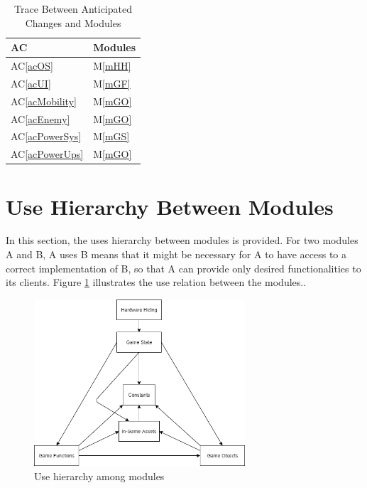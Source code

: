 \documentclass[12pt, titlepage]{article}
\newcommand{\acref}[1]{AC\ref{#1}}
\newcommand{\mref}[1]{M\ref{#1}}
\begin{document}
\begin{table}[H]
\centering
\begin{tabular}{p{} p{}}
\toprule
\textbf{AC} & \textbf{Modules}\\
\midrule
\acref{acOS} & \mref{mHH}\\
\acref{acUI} & \mref{mGF}\\
\acref{acMobility} & \mref{mGO}\\
\acref{acEnemy} & \mref{mGO}\\
\acref{acPowerSys} & \mref{mGS}\\
\acref{acPowerUps} & \mref{mGO}\\
\bottomrule
\end{tabular}
\caption{Trace Between Anticipated Changes and Modules}
\label{TblACT}
\end{table}

\section{Use Hierarchy Between Modules} \label{SecUse}

In this section, the uses hierarchy between modules is provided. For two modules A and B, A uses B means that it might be necessary for A to have access to a correct implementation of B, so that A can provide only desired functionalities to its clients.  Figure \ref{FigUH} illustrates the use relation between
the modules..

\begin{figure}[H]
\centering
\includegraphics[width=0.7\textwidth]{UsesHierarchy.png}
\caption{Use hierarchy among modules}
\label{FigUH}
\end{figure}
\end{document}
